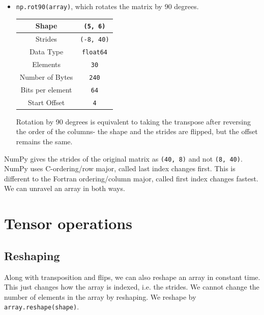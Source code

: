 \documentclass[a4paper, openany]{memoir}
\begin{document}
\begin{itemize}
        \item \texttt{np.rot90(array)}, which rotates the matrix by 90 degrees.
        \begin{table}[H]
            \centering
            \begin{tabular}{|c|c|}
                \hline
                Shape & \texttt{(5, 6)} \\
                \hline
                Strides & \texttt{(-8, 40)} \\
                \hline
                Data Type & \texttt{float64} \\
                \hline
                Elements & \texttt{30} \\
                \hline
                Number of Bytes & \texttt{240} \\
                \hline
                Bits per element & \texttt{64} \\
                \hline
                Start Offset & \texttt{4} \\
                \hline
            \end{tabular}
        \end{table}
        Rotation by 90 degrees is equivalent to taking the transpose after reversing the order of the columns- the shape and the strides are flipped, but the offset remains the same.
    \end{itemize}

    NumPy gives the strides of the original matrix as \texttt{(40, 8)} and not \texttt{(8, 40)}. NumPy uses C-ordering/row major, called last index changes first. This is different to the Fortran ordering/column major, called first index changes fastest. We can unravel an array in both ways. 
    

    \section{Tensor operations}
    \subsection{Reshaping}
    Along with transposition and flips, we can also reshape an array in constant time. This just changes how the array is indexed, i.e. the strides. We cannot change the number of elements in the array by reshaping. We reshape by \texttt{array.reshape(shape)}.
\end{document}
